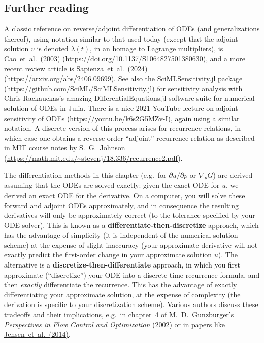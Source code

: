 \subsection{Further reading}

A classic reference on reverse/adjoint differentiation of ODEs (and
generalizations thereof), using notation similar to that used today
(except that the adjoint solution $v$ is denoted $\lambda(t)$, in an
homage to Lagrange multipliers), is Cao~et~al.~(2003) (\url{https://doi.org/10.1137/S1064827501380630}), and a more recent review article is Sapienza~et~al.~(2024) (\url{https://arxiv.org/abs/2406.09699}).
See also the SciMLSensitivity.jl package (\url{https://github.com/SciML/SciMLSensitivity.jl})
for sensitivity analysis with Chris Rackauckas's amazing DifferentialEquations.jl
software suite for numerical solution of ODEs in Julia. There is a
nice 2021 YouTube lecture on adjoint sensitivity of ODEs (\url{https://youtu.be/k6s2G5MZv-I}),
again using a similar notation. A discrete version of this process
arises for recurrence relations, in which case one obtains a reverse-order
``adjoint'' recurrence relation as described in MIT course notes
by S.~G.~Johnson (\url{https://math.mit.edu/~stevenj/18.336/recurrence2.pdf}).

The differentiation methods in this chapter (e.g.~for $\partial u/\partial p$ or $\nabla_p G$) are derived assuming that the ODEs are solved exactly: given the exact ODE for $u$, we derived an exact ODE for the derivative. On a computer, you will solve these forward and adjoint ODEs approximately, and in consequence the resulting derivatives will only be approximately correct (to the tolerance specified by your ODE solver).  This is known as a {\bf differentiate-then-discretize} approach, which has the advantage of simplicity (it is independent of the numerical solution scheme) at the expense of slight inaccuracy (your approximate derivative will not exactly predict the first-order change in your approximate solution $u$).   The alternative is a {\bf discretize-then-differentiate} approach, in which you first approximate (``discretize'') your ODE into a discrete-time recurrence formula, and then \emph{exactly} differentiate the recurrence.  This has the advantage of exactly differentiating your approximate solution, at the expense of complexity (the derivation is specific to your discretization scheme).  Various authors discuss these tradeoffs and their implications, e.g.~in chapter~4 of M.~D.~Gunzburger's \href{https://doi.org/10.1137/1.9780898718720.ch4}{{\it Perspectives in Flow Control and Optimization}} (2002) or in papers like \href{https://dl.acm.org/doi/10.1007/s00158-013-1024-4}{Jensen~et~al.~(2014)}.